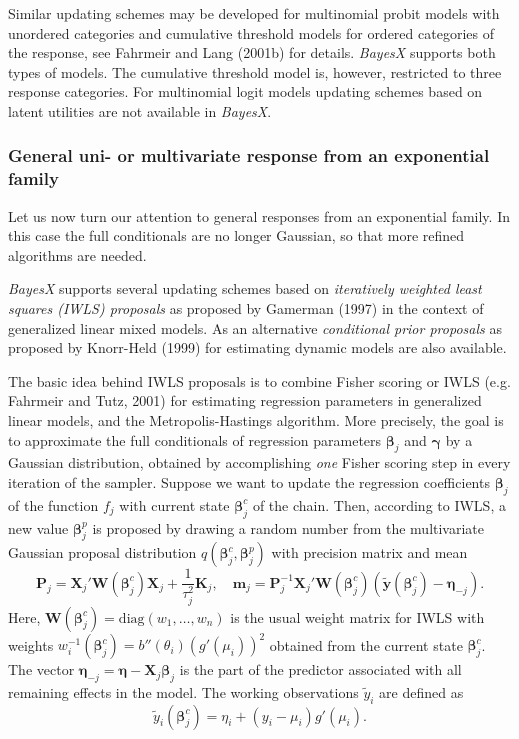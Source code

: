 \documentclass[11pt,a4paper,twoside]{bayesxarticle}
\newcommand{\diag}{\mbox{diag}}
\def \Kvec {\vec{K}}
\def \Pvec {\vec{P}}
\def \betavec {\boldsymbol{\beta}}
\def \etavec {\boldsymbol{\eta}}
\def \gammavec {\boldsymbol{\gamma}}
\def \yvec {\mathbf{y}}
\def \mvec {\mathbf{m}}
\def \Kvec {\mathbf{K}}
\def \Wvec {\mathbf{W}}
\def \Pvec {\mathbf{P}}
\def \Xvec {\mathbf{X}}
\begin{document}
Similar updating schemes may be developed for multinomial probit
models with unordered categories and cumulative threshold models for
ordered categories of the response, see Fahrmeir and Lang (2001b)
for details. {\em BayesX} supports both types of models. The
cumulative threshold model is, however, restricted to three response
categories. For multinomial logit models updating schemes based on
latent utilities are not available in {\em BayesX}.

\subsubsection{General uni- or multivariate response from an exponential family}
\label{IWLS} 

Let us now turn our attention to general responses from an
exponential family. In this case the full conditionals are no longer
Gaussian, so that more refined algorithms are needed.

{\em BayesX} supports several updating schemes based on {\em
iteratively weighted least squares (IWLS) proposals} as proposed by
Gamerman (1997) in the context of generalized linear mixed models.
As an alternative {\em conditional prior proposals} as proposed by
Knorr-Held (1999) for estimating dynamic models are also available.

The basic idea behind IWLS proposals is to combine Fisher scoring
or IWLS (e.g. Fahrmeir and Tutz, 2001) for estimating regression
parameters in generalized linear models, and the
Metropolis-Hastings algorithm. More precisely, the goal is to
approximate the full conditionals of regression parameters
$\betavec_j$ and $\gammavec$ by a Gaussian distribution, obtained by
accomplishing {\em one} Fisher scoring step in every iteration of
the sampler. Suppose we want to update the regression coefficients
$\betavec_j$ of the  function $f_j$ with current state $\betavec_j^c$ of
the chain. Then, according to IWLS, a new value $\betavec_j^p$ is
proposed by drawing a random number from the multivariate Gaussian
proposal distribution $q(\betavec_j^c,\betavec_j^p)$ with precision
matrix and mean
\begin{equation}
\label{prec} \Pvec_j = \Xvec_j'\Wvec(\betavec^c_j)\Xvec_j + \frac{1}{\tau^2_j} \Kvec_j,
\quad \mvec_j = \Pvec_j^{-1}\Xvec_j'\Wvec(\betavec^c_j)(\tilde{\yvec}(\betavec^c_j) -
\etavec_{-j}).
\end{equation}
Here, $\Wvec(\betavec^c_j) = \diag(w_1,\dots,w_n)$ is the usual weight
matrix for IWLS with weights $w^{-1}_i(\betavec^c_j) =
b''(\theta_i)(g'(\mu_i))^2$ obtained from the current state
$\betavec^c_j$. The vector $\etavec_{-j}=\etavec-\Xvec_j\betavec_j$ is the part of
the predictor associated with all remaining effects in the model.
The working observations $\tilde{y}_i$ are defined as
$$\tilde{y}_i(\betavec^c_j) = \eta_i + (y_i - \mu_i)g'(\mu_i).$$
\end{document}
